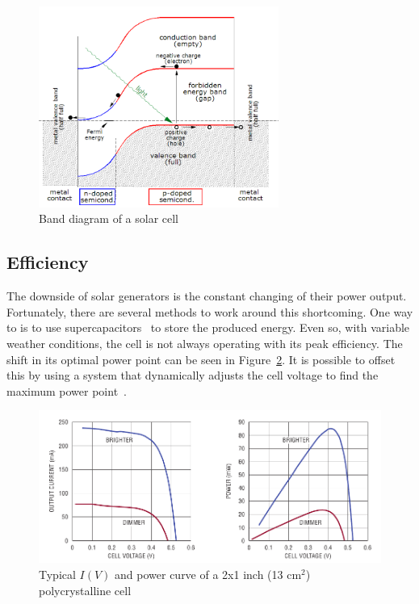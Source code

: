 \documentclass[a4paper,10pt]{article}
\begin{document}
\begin{figure}[!h]
\centering
\includegraphics[width=0.7\textwidth]{./Slike/PV-band-diagram}
 \caption{Band diagram of a solar cell~\cite{wiki:solar-cells}}
\label{fig:pv-band-diagram}
\end{figure}

\subsection{Efficiency}

The downside of solar generators is the constant changing of their power output. Fortunately, there are several methods to work around this shortcoming. One way to is to use supercapacitors~\cite{cap-wsn-ieee} to store the produced energy. Even so, with variable weather conditions, the cell is not always operating with its peak efficiency. The shift in its optimal power point can be seen in Figure~\ref{fig:pv-power-curve}. It is possible to offset this by using a system that dynamically adjusts the cell voltage to find the maximum power point~\cite{solar-mppt-ieee}. 

\begin{figure}[h!]
\includegraphics[width=\textwidth]{./Slike/PV-power-curve}
 \caption{Typical $I(V)$ and power curve of a 2x1 inch (13 cm$^2$) polycrystalline cell~\cite{Burgoine11}}
\label{fig:pv-power-curve}
\end{figure}
\end{document}
